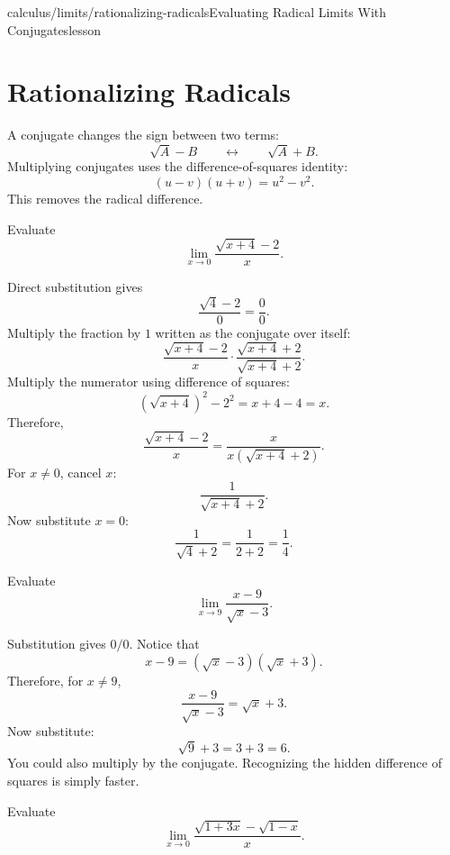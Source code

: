 \begin{webpage}{calculus/limits/rationalizing-radicals}{Evaluating Radical Limits With Conjugates}{lesson}
\section{Rationalizing Radicals}


A conjugate changes the sign between two terms:
\[
  \sqrt{A}-B
  \qquad\longleftrightarrow\qquad
  \sqrt{A}+B.
\]
Multiplying conjugates uses the difference-of-squares identity:
\[
  (u-v)(u+v)=u^2-v^2.
\]
This removes the radical difference.

\begin{bgguided}[title={One conjugate, every line shown}]
Evaluate
\[
  \lim_{x\to0}\frac{\sqrt{x+4}-2}{x}.
\]

\begin{bgsolution}
Direct substitution gives
\[
  \frac{\sqrt4-2}{0}=\frac00.
\]
Multiply the fraction by \(1\) written as the conjugate over itself:
\[
\frac{\sqrt{x+4}-2}{x}
\cdot
\frac{\sqrt{x+4}+2}{\sqrt{x+4}+2}.
\]
Multiply the numerator using difference of squares:
\[
  (\sqrt{x+4})^2-2^2=x+4-4=x.
\]
Therefore,
\[
\frac{\sqrt{x+4}-2}{x}
=\frac{x}{x(\sqrt{x+4}+2)}.
\]
For \(x\ne0\), cancel \(x\):
\[
  \frac{1}{\sqrt{x+4}+2}.
\]
Now substitute \(x=0\):
\[
  \frac1{\sqrt4+2}=\frac1{2+2}=\boxed{\frac14}.
\]
\end{bgsolution}
\end{bgguided}



\begin{bgexample}[title={Radical in the denominator}]
Evaluate
\[
  \lim_{x\to9}\frac{x-9}{\sqrt{x}-3}.
\]

\begin{bgsolution}
Substitution gives \(0/0\). Notice that
\[
  x-9=(\sqrt{x}-3)(\sqrt{x}+3).
\]
Therefore, for \(x\ne9\),
\[
  \frac{x-9}{\sqrt{x}-3}=\sqrt{x}+3.
\]
Now substitute:
\[
  \sqrt9+3=3+3=\boxed{6}.
\]
You could also multiply by the conjugate. Recognizing the hidden difference of squares is simply faster.
\end{bgsolution}
\end{bgexample}

\begin{bgexample}[title={Exam-level: two radical terms}]
Evaluate
\[
  \lim_{x\to0}\frac{\sqrt{1+3x}-\sqrt{1-x}}{x}.
\]


\end{bgexample}
\end{webpage}
